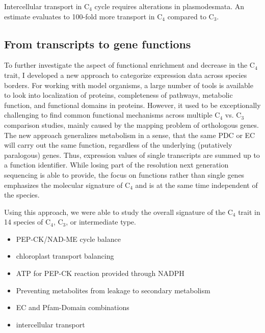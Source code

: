  Intercellular transport in C$_4$ cycle requires alterations in plasmodesmata.
 An estimate evaluates to 100-fold more transport in C$_4$ compared to C$_3$.

\subsection{From transcripts to gene functions}
	To further investigate the aspect of functional enrichment and decrease in the C$_4$ trait, I developed a new approach to categorize expression data across species borders.
	For working with model organisms, a large number of tools is available to look into localization of proteins, completeness of pathways, metabolic function, and functional domains in proteins.
	However, it used to be exceptionally challenging to find common functional mechanisms across multiple C$_4$ vs. C$_3$ comparison studies, mainly caused by the mapping problem of orthologous genes.
	The new approach generalizes metabolism in a sense, that the same \ac{PDC} or \ac{EC} will carry out the same function, regardless of the underlying (putatively paralogous) genes.
	Thus, expression values of single transcripts are summed up to a function identifier.
	While losing part of the resolution next generation sequencing is able to provide, the focus on functions rather than single genes emphasizes the molecular signature of C$_4$ and is at the same time independent of the species.
	
	Using this approach, we were able to study the overall signature of the C$_4$ trait in 14 species of C$_4$, C$_3$, or intermediate type.
	
	
	\begin{itemize}
		\item PEP-CK/NAD-ME cycle balance
		\item chloroplast transport balancing
		\item ATP for PEP-CK reaction provided through NADPH
		\item Preventing metabolites from leakage to secondary metabolism
		\item EC and Pfam-Domain combinations
		\item intercellular transport
	\end{itemize}
		